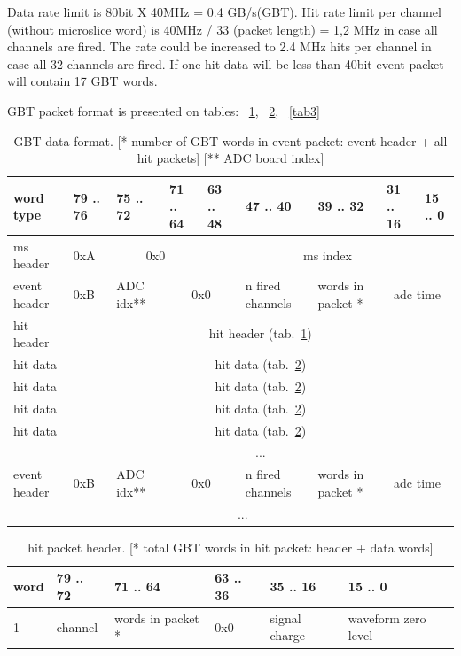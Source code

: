 \documentclass{article}
\begin{document}
Data rate limit is 80bit X 40MHz = 0.4 GB/s(GBT). Hit rate limit per channel (without microslice word) is 40MHz / 33 (packet length) = 1,2 MHz in case all channels are fired. The rate could be increased to  2.4 MHz hits per channel in case all 32 channels are fired. If one hit data will be less than 40bit event packet will contain 17 GBT words.

GBT packet format is presented on tables: ~\ref{tab1}, ~\ref{tab2}, ~\ref{tab3}





\begin{table}[H]
\centering
\begin{tabular}{| l | l | l | l | l | l | l | l | l |}
\hline
word type & 79 .. 76 & 75 .. 72 & 71 .. 64 & 63 .. 48 & 47 .. 40 & 39 .. 32 & 31 .. 16 & 15 .. 0 \\ \hline
ms header & 0xA & \multicolumn{2}{c|}{0x0}  & \multicolumn{5}{c|}{ms index} \\ \hline
event header & 0xB & ADC idx** & \multicolumn{2}{c|}{0x0} & n fired channels & words in packet * & \multicolumn{2}{c|}{adc time} \\ \hline
hit header & \multicolumn{8}{c|}{hit header (tab.~\ref{tab1})} \\ \hline
hit data & \multicolumn{8}{c|}{hit data (tab.~\ref{tab2})} \\ \hline
hit data & \multicolumn{8}{c|}{hit data (tab.~\ref{tab2})} \\ \hline
hit data & \multicolumn{8}{c|}{hit data (tab.~\ref{tab2})} \\ \hline
hit data & \multicolumn{8}{c|}{hit data (tab.~\ref{tab2})} \\ \hline
  & \multicolumn{8}{c|}{ ... } \\ \hline

event header & 0xB & ADC idx** & \multicolumn{2}{c|}{0x0} & n fired channels & words in packet * & \multicolumn{2}{c|}{adc time} \\ \hline
  & \multicolumn{7}{c|}{ ... } \\ \hline

\end{tabular}
\caption{GBT data format. [* number of GBT words in event packet: event header + all hit packets] [** ADC board index] \label{tab1}}
\end{table}

\begin{table}[H]
\centering
\begin{tabular}{| l | l | l | l | l | l |}
\hline
word & 79 .. 72 & 71 .. 64 & 63 .. 36 & 35 .. 16 & 15 .. 0 \\ \hline
1 & channel &words in packet *& 0x0 & signal charge & waveform zero level \\ \hline
\end{tabular}
\caption{hit packet header. [* total GBT words in hit packet: header + data words]\label{tab2}}
\end{table}
\end{document}
